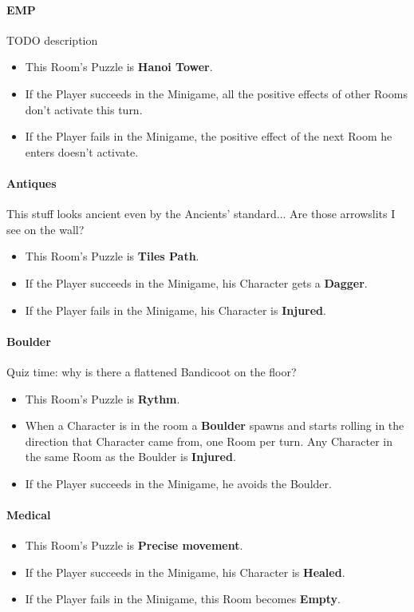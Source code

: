 \paragraph{EMP} TODO description
\begin{itemize}
	\item This Room's Puzzle is \textbf{Hanoi Tower}.
	\item If the Player succeeds in the Minigame, all the positive effects of other Rooms don't activate this turn.
	\item If the Player fails    in the Minigame, the positive effect of the next Room he enters doesn't activate.
\end{itemize}

\paragraph{Antiques} This stuff looks ancient even by the Ancients' standard... Are those arrowslits I see on the wall?
\begin{itemize}
	\item This Room's Puzzle is \textbf{Tiles Path}.
	\item If the Player succeeds in the Minigame, his Character gets a \textbf{Dagger}.
	\item If the Player fails    in the Minigame, his Character is \textbf{Injured}.
\end{itemize}

\paragraph{Boulder} Quiz time: why is there a flattened Bandicoot on the floor?
\begin{itemize}
	\item This Room's Puzzle is \textbf{Rythm}.
	\item When a Character is in the room a \textbf{Boulder} spawns and starts rolling in the direction that Character came from, one Room per turn. Any Character in the same Room as the Boulder is \textbf{Injured}.
	\item If the Player succeeds in the Minigame, he avoids the Boulder.
\end{itemize}

\paragraph{Medical} 
\begin{itemize}
	\item This Room's Puzzle is \textbf{Precise movement}.
	\item If the Player succeeds in the Minigame, his Character is \textbf{Healed}.
	\item If the Player fails    in the Minigame, this Room becomes \textbf{Empty}.
\end{itemize}

